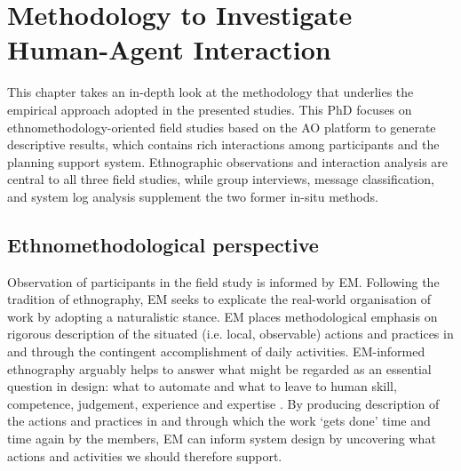




\chapter{Methodology to Investigate Human-Agent Interaction}\label{ch:methodology}
This chapter takes an in-depth look at the methodology that underlies the empirical approach adopted in the presented studies. This PhD focuses on ethnomethodology-oriented field studies based on the \acf{AO} platform to generate descriptive results, which contains rich interactions among participants and the planning support system. Ethnographic observations and interaction analysis are central to all three field studies, while group interviews, message classification, and system log analysis supplement the two former in-situ methods.\\

\section{Ethnomethodological perspective}
Observation of participants in the field study is informed by \acf{EM}. Following the tradition of ethnography, \ac{EM} seeks to explicate the real-world organisation of work by adopting a naturalistic stance. \ac{EM} places methodological emphasis on rigorous description of the situated (i.e. local, observable) actions and practices \citep{Suchman1987} in and through the contingent accomplishment of daily activities. \ac{EM}-informed ethnography arguably helps to answer what might be regarded as an essential question in design: what to automate and what to leave to human skill, competence, judgement, experience and expertise \citep{Crabtree2012}. By producing description of the actions and practices in and through which the work `gets done' time and time again by the members, \ac{EM} can inform system design by uncovering what actions and activities we should therefore support.\\

